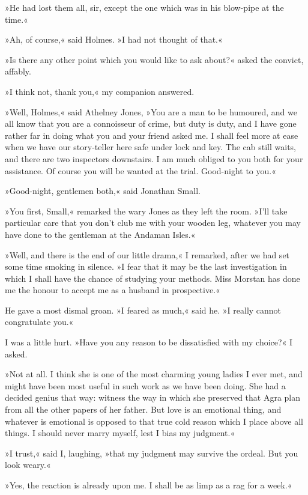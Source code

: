 »He had lost them all, sir, except the one which was in his blow-pipe at the time.«

»Ah, of course,« said Holmes. »I had not thought of that.«

»Is there any other point which you would like to ask about?« asked the convict, affably.

»I think not, thank you,« my companion answered.

»Well, Holmes,« said Athelney Jones, »You are a man to be humoured, and we all know that you are a connoisseur of crime, but duty is duty, and I have gone rather far in doing what you and your friend asked me. I shall feel more at ease when we have our story-teller here safe under lock and key. The cab still waits, and there are two inspectors downstairs. I am much obliged to you both for your assistance. Of course you will be wanted at the trial. Good-night to you.«

»Good-night, gentlemen both,« said Jonathan Small.

»You first, Small,« remarked the wary Jones as they left the room. »I'll take particular care that you don't club me with your wooden leg, whatever you may have done to the gentleman at the Andaman Isles.«

»Well, and there is the end of our little drama,« I remarked, after we had set some time smoking in silence. »I fear that it may be the last investigation in which I shall have the chance of studying your methods. Miss Morstan has done me the honour to accept me as a husband in prospective.«

He gave a most dismal groan. »I feared as much,« said he. »I really cannot congratulate you.«

I was a little hurt. »Have you any reason to be dissatisfied with my choice?« I asked.

»Not at all. I think she is one of the most charming young ladies I ever met, and might have been most useful in such work as we have been doing. She had a decided genius that way: witness the way in which she preserved that Agra plan from all the other papers of her father. But love is an emotional thing, and whatever is emotional is opposed to that true cold reason which I place above all things. I should never marry myself, lest I bias my judgment.«

»I trust,« said I, laughing, »that my judgment may survive the ordeal. But you look weary.«

»Yes, the reaction is already upon me. I shall be as limp as a rag for a week.«

